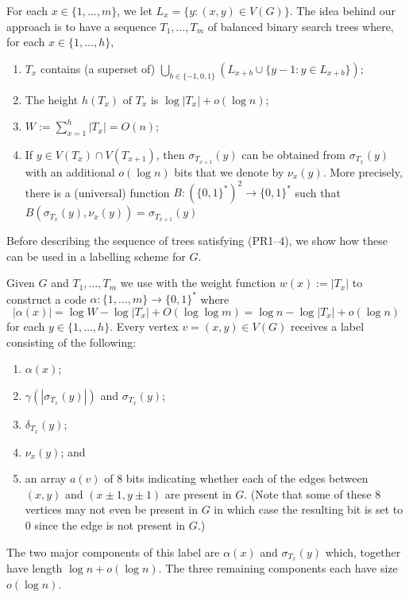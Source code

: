 \documentclass[kpfonts]{patmorin}
\begin{document}
For each $x\in\{1,\ldots,m\}$, we let $L_x=\{y:(x,y)\in V(G)\}$.  The idea behind our approach is to have a sequence $T_1,\ldots,T_m$ of balanced binary search trees where, for each $x\in\{1,\ldots,h\}$,
\begin{enumerate}[(PR1)]
  \item $T_x$ contains (a superset of) $\bigcup_{b\in\{-1,0,1\}} (L_{x+b}\cup \{y-1:y\in L_{x+b}\})$;
  \item The height $h(T_x)$ of $T_x$ is $\log |T_x| + o(\log n)$;
  \item $W:=\sum_{x=1}^h |T_x| = O(n)$;
  \item If $y\in V(T_x)\cap V(T_{x+1})$, then $\sigma_{T_{x+1}}(y)$ can be obtained from $\sigma_{T_{x}}(y)$ with an additional $o(\log n)$ bits that we denote by $\nu_x(y)$.  More precisely, there is a (universal) function $B:(\{0,1\}^*)^2\to\{0,1\}^*$ such that $B(\sigma_{T_{x}}(y), \nu_x(y))=\sigma_{T_{x+1}}(y)$
\end{enumerate}

Before describing the sequence of trees satisfying (PR1--4), we show how these can be used in a labelling scheme for $G$. 

Given $G$ and $T_{1},\ldots,T_m$ we use  with the weight function $w(x):=|T_x|$ to construct a code $\alpha:\{1,\ldots,m\}\to\{0,1\}^*$ where
\[  
  |\alpha(x)| = \log W-\log|T_x| + O(\log\log m) = \log n - \log|T_x| + o(\log n)
\]
for each $y\in\{1,\ldots,h\}$.  Every vertex $v=(x,y)\in V(G)$ receives a label consisting of the following:  
\begin{enumerate}
  \item $\alpha(x)$;
  \item $\gamma(|\sigma_{T_x}(y)|)$ and $\sigma_{T_x}(y)$;    
  \item $\delta_{T_x}(y)$;
  \item $\nu_x(y)$; and
  \item an array $a(v)$ of $8$ bits indicating whether each of the edges between $(x,y)$ and $(x\pm 1,y\pm 1)$ are present in $G$.  (Note that some of these 8 vertices may not even be present in $G$ in which case the resulting bit is set to 0 since the edge is not present in $G$.)
\end{enumerate}
The two major components of this label are $\alpha(x)$ and $\sigma_{T_x}(y)$ which, together have length $\log n + o(\log n)$.  The three remaining components each have size $o(\log n)$.
\end{document}
